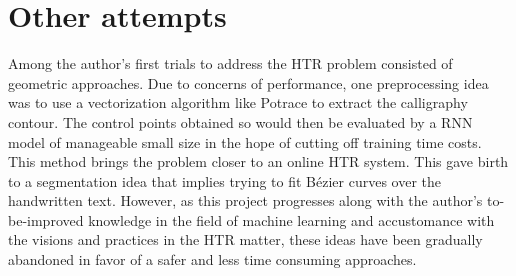 \section{Other attempts}
\label{sec:ch5sec6}

Among the author's first trials to address the HTR problem consisted of geometric approaches. Due to concerns of performance, one preprocessing idea was to use a vectorization algorithm like Potrace \cite{Potrace} to extract the calligraphy contour. The control points obtained so would then be evaluated by a RNN model of manageable small size in the hope of cutting off training time costs. This method brings the problem closer to an online HTR system. This gave birth to a segmentation idea that implies trying to fit B{\'e}zier curves over the handwritten text. However, as this project progresses along with the author's to-be-improved knowledge in the field of machine learning and accustomance with the visions and practices in the HTR matter, these ideas have been gradually abandoned in favor of a safer and less time consuming approaches.
